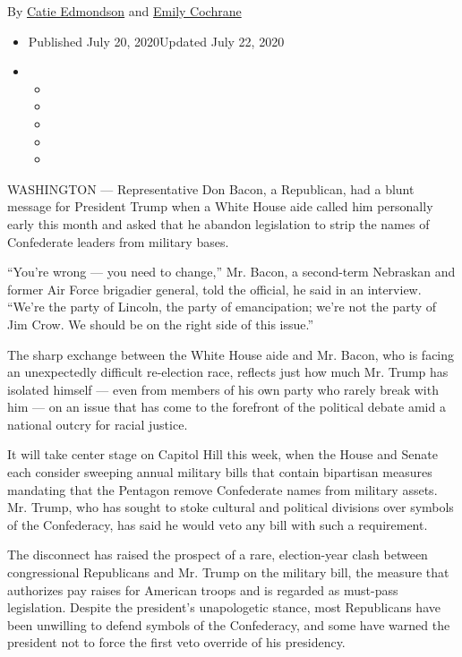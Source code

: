 By \href{https://www.nytimes.com/by/catie-edmondson}{Catie Edmondson}
and \href{https://www.nytimes.com/by/emily-cochrane}{Emily Cochrane}

\begin{itemize}
\item
  Published July 20, 2020Updated July 22, 2020
\item
  \begin{itemize}
  \item
  \item
  \item
  \item
  \item
  \end{itemize}
\end{itemize}

WASHINGTON --- Representative Don Bacon, a Republican, had a blunt
message for President Trump when a White House aide called him
personally early this month and asked that he abandon legislation to
strip the names of Confederate leaders from military bases.

``You're wrong --- you need to change,'' Mr. Bacon, a second-term
Nebraskan and former Air Force brigadier general, told the official, he
said in an interview. ``We're the party of Lincoln, the party of
emancipation; we're not the party of Jim Crow. We should be on the right
side of this issue.''

The sharp exchange between the White House aide and Mr. Bacon, who is
facing an unexpectedly difficult re-election race, reflects just how
much Mr. Trump has isolated himself --- even from members of his own
party who rarely break with him --- on an issue that has come to the
forefront of the political debate amid a national outcry for racial
justice.

It will take center stage on Capitol Hill this week, when the House and
Senate each consider sweeping annual military bills that contain
bipartisan measures mandating that the Pentagon remove Confederate names
from military assets. Mr. Trump, who has sought to stoke cultural and
political divisions over symbols of the Confederacy, has said he would
veto any bill with such a requirement.

The disconnect has raised the prospect of a rare, election-year clash
between congressional Republicans and Mr. Trump on the military bill,
the measure that authorizes pay raises for American troops and is
regarded as must-pass legislation. Despite the president's unapologetic
stance, most Republicans have been unwilling to defend symbols of the
Confederacy, and some have warned the president not to force the first
veto override of his presidency.

